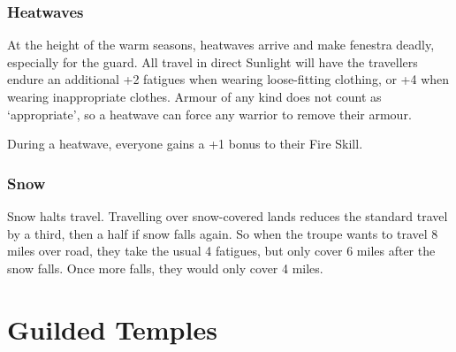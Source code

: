 \begin{multicols}{2}
\subsubsection{Heatwaves}

At the height of the warm seasons, heatwaves arrive and make \gls{fenestra} deadly, especially for the \gls{guard}.
All travel in direct Sunlight will have the travellers endure an additional +2 \glspl{fatigue} when wearing loose-fitting clothing, or +4 when wearing inappropriate clothes.
Armour of any kind does not count as `appropriate', so a heatwave can force any warrior to remove their armour.

During a heatwave, everyone gains a +1 bonus to their Fire Skill.

\subsubsection{Snow}

Snow halts travel.
Travelling over snow-covered lands reduces the standard travel by a third, then a half if snow falls again.
So when the troupe wants to travel 8 miles over road, they take the usual 4 \glspl{fatigue}, but only cover 6 miles after the snow falls.
Once more falls, they would only cover 4 miles.

\end{multicols}

\section{Guilded Temples}

\newcommand\guildRank[1]{\item[#1]\index{#1 (rank)}}

